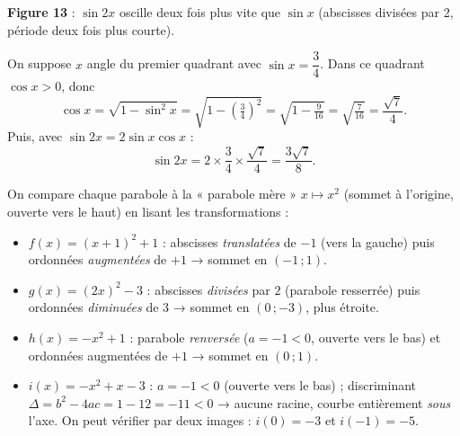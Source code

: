 \documentclass[11pt,a4paper]{article}
\begin{document}
\begin{center}
\textbf{\textcolor{primary}{Figure 13}} : $\sin 2x$ oscille deux fois plus vite que $\sin x$
(abscisses divisées par 2, période deux fois plus courte).
\end{center}

\begin{exemple}
On suppose $x$ angle du premier quadrant avec $\sin x=\dfrac34$. Dans ce quadrant
$\cos x>0$, donc
\[
  \cos x=\sqrt{1-\sin^2 x}=\sqrt{1-\left(\tfrac34\right)^2}=\sqrt{1-\tfrac{9}{16}}
  =\sqrt{\tfrac{7}{16}}=\frac{\sqrt7}{4}.
\]
Puis, avec $\sin 2x=2\sin x\cos x$ :
\[
  \sin 2x=2\times\frac34\times\frac{\sqrt7}{4}=\frac{3\sqrt7}{8}.
\]
\end{exemple}

\begin{exemple}
On compare chaque parabole à la « parabole mère » $x\mapsto x^2$ (sommet à l'origine,
ouverte vers le haut) en lisant les transformations :
\begin{itemize}[leftmargin=1.5em,topsep=2pt,itemsep=2pt]
  \item $f(x)=(x+1)^2+1$ : abscisses \emph{translatées} de $-1$ (vers la gauche) puis
        ordonnées \emph{augmentées} de $+1$ → sommet en $(-1\,;1)$.
  \item $g(x)=(2x)^2-3$ : abscisses \emph{divisées} par $2$ (parabole resserrée) puis
        ordonnées \emph{diminuées} de $3$ → sommet en $(0\,;-3)$, plus étroite.
  \item $h(x)=-x^2+1$ : parabole \emph{renversée} ($a=-1<0$, ouverte vers le bas) et
        ordonnées augmentées de $+1$ → sommet en $(0\,;1)$.
  \item $i(x)=-x^2+x-3$ : $a=-1<0$ (ouverte vers le bas) ; discriminant
        $\Delta=b^2-4ac=1-12=-11<0$ → aucune racine, courbe entièrement \emph{sous} l'axe.
        On peut vérifier par deux images : $i(0)=-3$ et $i(-1)=-5$.
\end{itemize}
\end{exemple}
\end{document}
